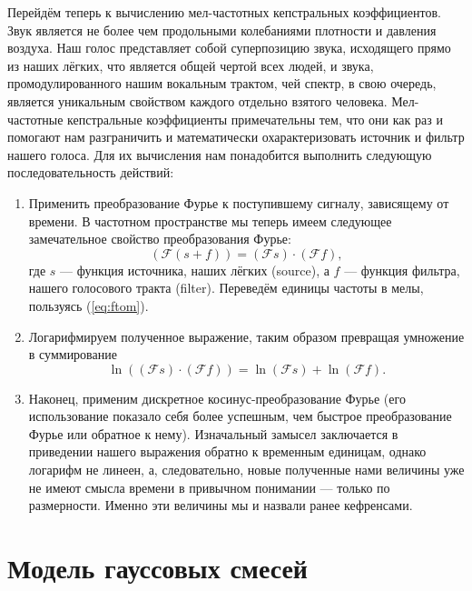 \documentclass[12pt]{gost-7-32}
\begin{document}
Перейдём теперь к вычислению мел-частотных кепстральных коэффициентов.
Звук является не более чем продольными колебаниями плотности и давления воздуха.
Наш голос представляет собой суперпозицию звука, исходящего прямо из наших лёгких, что является общей чертой всех людей, и звука, промодулированного нашим вокальным трактом, чей спектр, в свою очередь, является уникальным свойством каждого отдельно взятого человека.
Мел-частотные кепстральные коэффициенты примечательны тем, что они как раз и помогают нам разграничить и математически охарактеризовать источник и фильтр нашего голоса.
Для их вычисления нам понадобится выполнить следующую последовательность действий:
\begin{enumerate}
    \item Применить преобразование Фурье к поступившему сигналу, зависящему от времени.
        В частотном пространстве мы теперь имеем следующее замечательное свойство преобразования Фурье:
        \begin{equation}
            \left(\mathcal{F} (s + f) \right) = (\mathcal{F} s) \cdot (\mathcal{F} f),
        \end{equation}
        где $s$ --- функция источника, наших лёгких (source), а $f$ --- функция фильтра, нашего голосового тракта (filter).
        Переведём единицы частоты в мелы, пользуясь (\ref{eq:ftom}).

    \item Логарифмируем полученное выражение, таким образом превращая умножение в суммирование
        \begin{equation}
            \ln \left( (\mathcal{F} s) \cdot (\mathcal{F} f) \right) = \ln (\mathcal{F} s) + \ln (\mathcal{F} f).
        \end{equation}

    \item Наконец, применим дискретное косинус-преобразование Фурье (его использование показало себя более успешным, чем быстрое преобразование Фурье или обратное к нему).
        Изначальный замысел заключается в приведении нашего выражения обратно к временным единицам, однако логарифм не линеен, а, следовательно, новые полученные нами величины уже не имеют смысла времени в привычном понимании --- только по размерности.
        Именно эти величины мы и назвали ранее кефренсами.
\end{enumerate}

\section{Модель гауссовых смесей}
\end{document}

